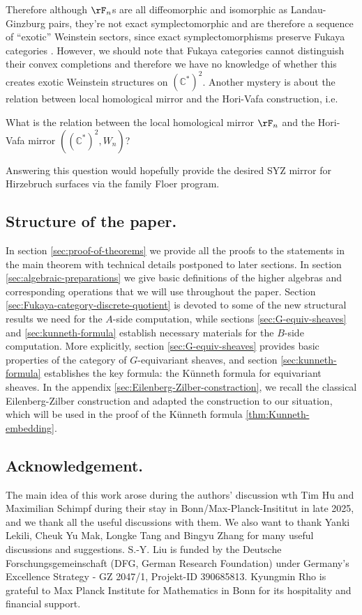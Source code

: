 Therefore although $\rF_n$s are all diffeomorphic and isomorphic as Landau-Ginzburg pairs, they're not exact symplectomorphic and are therefore a sequence of ``exotic'' Weinstein sectors, since exact symplectomorphisms preserve Fukaya categories \cite{HS26}. However, we should note that Fukaya categories cannot distinguish their convex completions and therefore we have no knowledge of whether this creates exotic Weinstein structures on $\left(\mathbb{C}^{\ast}\right)^2$. Another mystery is about the relation between local homological mirror and the Hori-Vafa construction, i.e.
\begin{ques}\label{Q:HV-vs-LHMS}
    What is the relation between the local homological mirror $\rF_n$ and the Hori-Vafa mirror $\left((\mathbb{C}^{\ast})^2,W_n\right)$?
\end{ques}
Answering this question would hopefully provide the desired SYZ mirror for Hirzebruch surfaces via the family Floer program.
\subsection{Structure of the paper.} In section \ref{sec:proof-of-theorems} we provide all the proofs to the statements in the main theorem with technical details postponed to later sections. In section \ref{sec:algebraic-preparations} we give basic definitions of the higher algebras and corresponding operations that we will use throughout the paper. Section \ref{sec:Fukaya-category-discrete-quotient} is devoted to some of the new structural results we need for the $A$-side computation, while sections \ref{sec:G-equiv-sheaves} and \ref{sec:kunneth-formula} establish necessary materials for the $B$-side computation. More explicitly, section \ref{sec:G-equiv-sheaves} provides basic properties of the category of $G$-equivariant sheaves, and section \ref{sec:kunneth-formula} establishes the key formula: the K\"unneth formula for equivariant sheaves. In the appendix \ref{sec:Eilenberg-Zilber-constraction}, we recall the classical Eilenberg-Zilber construction and adapted the construction to our situation, which will be used in the proof of the K\"unneth formula \ref{thm:Kunneth-embedding}.
\subsection*{Acknowledgement.} The main idea of this work arose during the authors' discussion wth Tim Hu and Maximilian Schimpf during their stay in Bonn/Max-Planck-Insititut in late 2025, and we thank all the useful discussions with them.
We also want to thank Yanki Lekili, Cheuk Yu Mak, Longke Tang and Bingyu Zhang for many useful discussions and suggestions.
S.-Y. Liu is funded by the Deutsche Forschungsgemeinschaft (DFG, German Research Foundation) under Germany's Excellence Strategy - GZ 2047/1, Projekt-ID 390685813.
Kyungmin Rho is grateful to Max Planck Institute for Mathematics in Bonn for its hospitality and financial support.
